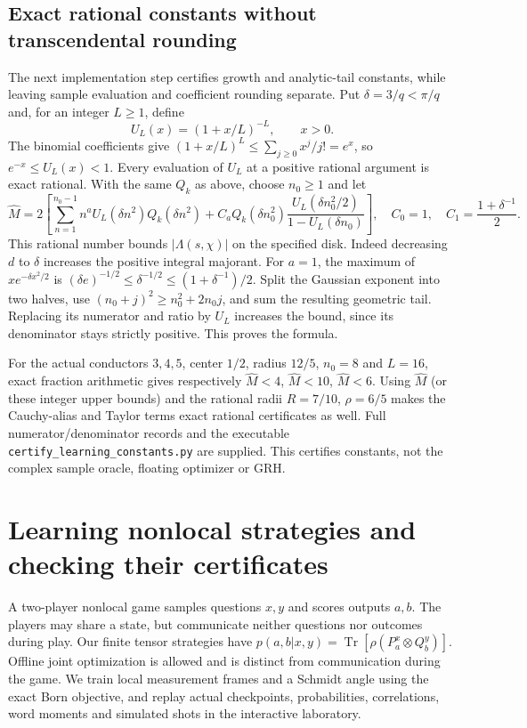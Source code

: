 \documentclass[11pt]{article}
\theoremstyle{definition}\newtheorem{definition}[theorem]{Definition}
\theoremstyle{remark}\newtheorem{remark}[theorem]{Remark}
\begin{document}
\subsection{Exact rational constants without transcendental rounding}
The next implementation step certifies growth and analytic-tail constants,
while leaving sample evaluation and coefficient rounding separate. Put
$\delta=3/q<\pi/q$ and, for an integer $L\ge1$, define
\[
 U_L(x)=(1+x/L)^{-L},\qquad x>0.
\]
The binomial coefficients give
$(1+x/L)^L\le\sum_{j\ge0}x^j/j!=e^x$, so $e^{-x}\le U_L(x)<1$.
Every evaluation of $U_L$ at a positive rational argument is exact rational.
With the same $Q_k$ as above, choose $n_0\ge1$ and let
\[
 \widehat M=2\left[
 \sum_{n=1}^{n_0-1} n^aU_L(\delta n^2)Q_k(\delta n^2)
 +C_aQ_k(\delta n_0^2)
 \frac{U_L(\delta n_0^2/2)}{1-U_L(\delta n_0)}\right],
 \quad C_0=1,\quad C_1=\frac{1+\delta^{-1}}2.
\]
This rational number bounds $|\Lambda(s,\chi)|$ on the specified disk.
Indeed decreasing $d$ to $\delta$ increases the positive integral majorant.
For $a=1$, the maximum of $x e^{-\delta x^2/2}$ is
$(\delta e)^{-1/2}\le\delta^{-1/2}\le(1+\delta^{-1})/2$.
Split the Gaussian exponent into two halves, use
$(n_0+j)^2\ge n_0^2+2n_0j$, and sum the resulting geometric tail.
Replacing its numerator and ratio by $U_L$ increases the bound, since its
denominator stays strictly positive. This proves the formula.

For the actual conductors $3,4,5$, center $1/2$, radius $12/5$, $n_0=8$
and $L=16$, exact fraction arithmetic gives respectively
$\widehat M<4$, $\widehat M<10$, $\widehat M<6$.
Using $\widehat M$ (or these integer upper bounds) and the rational radii
$R=7/10$, $\rho=6/5$ makes the Cauchy-alias and Taylor terms exact rational
certificates as well. Full numerator/denominator records and the executable
\texttt{certify\_learning\_constants.py} are supplied. This certifies
constants, not the complex sample oracle, floating optimizer or GRH.

\section{Learning nonlocal strategies and checking their certificates}
\label{qg:section}
A two-player nonlocal game samples questions $x,y$ and scores outputs $a,b$.
The players may share a state, but communicate neither questions nor outcomes
during play. Our finite tensor strategies have
$p(a,b|x,y)=\operatorname{Tr}[\rho(P_a^x\otimes Q_b^y)]$.
Offline joint optimization is allowed and is distinct from communication
during the game. We train local measurement frames and a Schmidt angle using
the exact Born objective, and replay actual checkpoints, probabilities,
correlations, word moments and simulated shots in the interactive laboratory.
\end{document}
